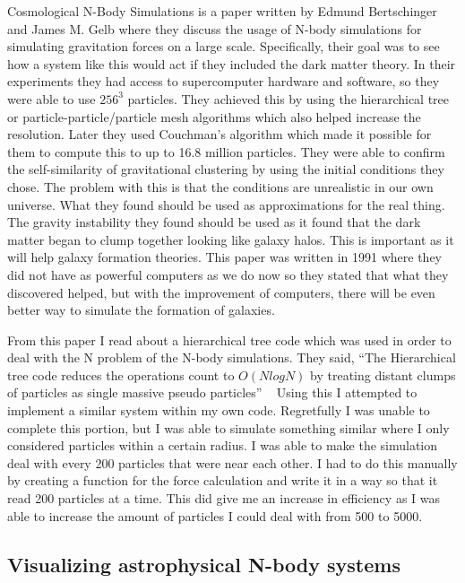 \documentclass{egpubl}
\begin{document}
    Cosmological N-Body Simulations is a paper written by Edmund Bertschinger and James M. Gelb where they discuss the usage of N-body simulations for simulating gravitation forces on a large scale. Specifically, their goal was to see how a system like this would act if they included the dark matter theory. In their experiments they had access to supercomputer hardware and software, so they were able to use $256^3$ particles. They achieved this by using the hierarchical tree or particle-particle/particle mesh algorithms which also helped increase the resolution. Later they used Couchman’s algorithm which made it possible for them to compute this to up to 16.8 million particles. They were able to confirm the self-similarity of gravitational clustering by using the initial conditions they chose. The problem with this is that the conditions are unrealistic in our own universe. What they found should be used as approximations for the real thing.  The gravity instability they found should be used as it found that the dark matter began to clump together looking like galaxy halos. This is important as it will help galaxy formation theories. This paper was written in 1991 where they did not have as powerful computers as we do now so they stated that what they discovered helped, but with the improvement of computers, there will be even better way to simulate the formation of galaxies.

    From this paper I read about a hierarchical tree code which was used in order to deal with the N problem of the N-body simulations. They said, “The Hierarchical tree code reduces the operations count to $O(NlogN)$ by treating distant clumps of particles as single massive pseudo particles” ~\cite{bertschinger1991cosmological} Using this I attempted to implement a similar system within my own code. Regretfully I was unable to complete this portion, but I was able to simulate something similar where I only considered particles within a certain radius. I was able to make the simulation deal with every 200 particles that were near each other. I had to do this manually by creating a function for the force calculation and write it in a way so that it read 200 particles at a time. This did give me an increase in efficiency as I was able to increase the amount of particles I could deal with from 500 to 5000.

\subsection{Visualizing astrophysical N-body systems}
\end{document}
